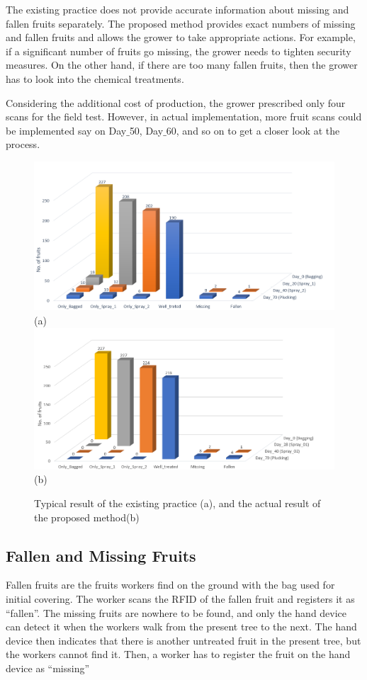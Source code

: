 \documentclass[journal]{IEEEtran}
\begin{document}
The existing practice does not provide accurate information about missing and fallen fruits separately. The proposed method provides exact numbers of missing and fallen fruits and allows the grower to take appropriate actions. For example, if a significant number of fruits go missing, the grower needs to tighten security measures. On the other hand, if there are too many fallen fruits, then the grower has to look into the chemical treatments.\par
Considering the additional cost of production, the grower prescribed only four scans for the field test. However, in actual implementation, more fruit scans could be implemented say on Day$\_$50, Day$\_$60, and so on to get a closer look at the process.
\begin{figure}[ht]
	\centering
	\includegraphics[width = 14cm]{graphics/Res_Old2}(a)
	\includegraphics[width = 14cm]{graphics/Res_New2}(b)
	\caption{Typical result of the existing practice (a), and the actual result of the proposed method(b)}
	\label{fig_3}
\end{figure}

\subsection{Fallen and Missing Fruits}
Fallen fruits are the fruits workers find on the ground with the bag used for initial covering. The worker scans the RFID of the fallen fruit and registers it as “fallen”. The missing fruits are nowhere to be found, and only the hand device can detect it when the workers walk from the present tree to the next. The hand device then indicates that there is another untreated fruit in the present tree, but the workers cannot find it. Then, a worker has to register the fruit on the hand device as “missing”
\end{document}
